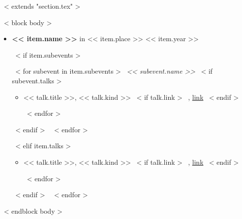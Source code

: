 ~< extends "section.tex" >~

~< block body >~

\begin{itemize}
\setlength\itemsep{0.3em}
~< for item in items >~
    \item
        \textbf{<< item.name >>} in << item.place >> \hfill << item.year >>
        
        ~< if item.subevents >~
        \begin{small}    
                ~< for subevent in item.subevents >~ 
                    \textit{<< subevent.name >>}
                    ~< if subevent.talks >~
                        \begin{itemize}
                            ~< for talk in subevent.talks >~

                                \item
                                {<< talk.title >>},
                                << talk.kind >>
                                ~< if talk.link >~
                                    , \href{<< talk.link >>}{link}
                                ~< endif >~

                            ~< endfor >~
                            
                        \end{itemize}
                    ~< endif >~
                ~< endfor >~

        \end{small}
        ~< elif item.talks >~
            \begin{small}   
                \begin{itemize}
                    ~< for talk in item.talks >~

                        \item
                        {<< talk.title >>},
                        << talk.kind >>
                        ~< if talk.link >~
                            , \href{<< talk.link >>}{link}
                        ~< endif >~

                    ~< endfor >~
                    
                \end{itemize}
            \end{small}
        ~< endif >~
~< endfor >~
\end{itemize}
~< endblock body >~
